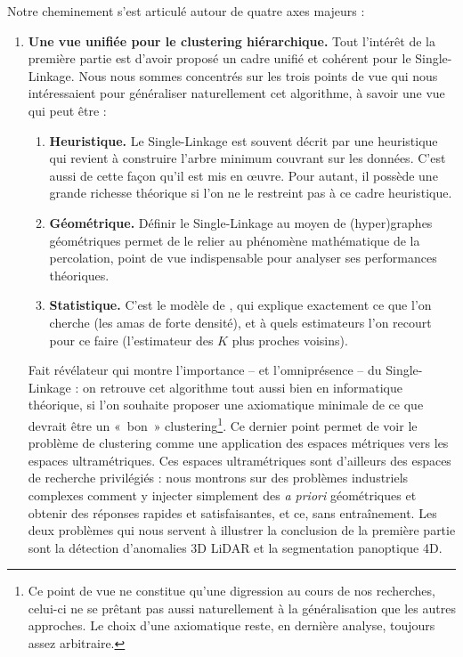 Notre cheminement s'est articulé autour de quatre axes majeurs :
\begin{enumerate}
    \item \textbf{Une vue unifiée pour le clustering hiérarchique.} Tout l'intérêt de la première partie est d'avoir proposé un cadre unifié et cohérent pour le Single-Linkage. Nous nous sommes concentrés sur les trois points de vue qui nous intéressaient pour généraliser naturellement cet algorithme, à savoir une vue qui peut être :
    \begin{enumerate}
        \item \textbf{Heuristique.} Le Single-Linkage est souvent décrit par une heuristique qui revient à construire l'arbre minimum couvrant sur les données. C'est aussi de cette façon qu'il est mis en œuvre. Pour autant, il possède une grande richesse théorique si l'on ne le restreint pas à ce cadre heuristique.
        \item \textbf{Géométrique.} Définir le Single-Linkage au moyen de (hyper)graphes géométriques permet de le relier au phénomène mathématique de la percolation, point de vue indispensable pour analyser ses performances théoriques.
        \item \textbf{Statistique.} C'est le modèle de , qui explique exactement ce que l'on cherche (les amas de forte densité), et à quels estimateurs l'on recourt pour ce faire (l'estimateur des $K$ plus proches voisins).
    \end{enumerate}
    Fait révélateur qui montre l'importance -- et l'omniprésence -- du Single-Linkage : on retrouve cet algorithme tout aussi bien en informatique théorique, si l'on souhaite proposer une axiomatique minimale de ce que devrait être un «~bon~» clustering\footnote{Ce point de vue ne constitue qu'une digression au cours de nos recherches, celui-ci ne se prêtant pas aussi naturellement à la généralisation que les autres approches. Le choix d'une axiomatique reste, en dernière analyse, toujours assez arbitraire.}.
    Ce dernier point permet de voir le problème de clustering comme une application des espaces métriques vers les espaces ultramétriques. Ces espaces ultramétriques sont d'ailleurs des espaces de recherche privilégiés : nous montrons sur des problèmes industriels complexes comment y injecter simplement des \emph{a priori} géométriques et obtenir des réponses rapides et satisfaisantes, et ce, sans entraînement. Les deux problèmes qui nous servent à illustrer la conclusion de la première partie sont la détection d'anomalies 3D LiDAR et la segmentation panoptique 4D.

\end{enumerate}
